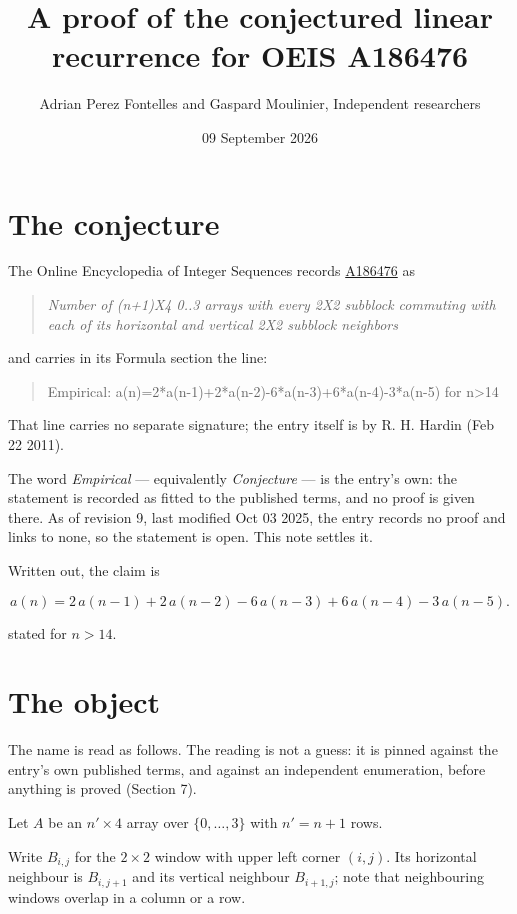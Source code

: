 \documentclass[11pt]{article}
\title{A proof of the conjectured linear recurrence for OEIS A186476}
\author{Adrian Perez Fontelles and Gaspard Moulinier, Independent researchers}
\date{09 September 2026}
\theoremstyle{definition}
\begin{document}
\maketitle
\section{The conjecture}

The Online Encyclopedia of Integer Sequences records \href{https://oeis.org/A186476}{A186476} as

\begin{quote}\itshape Number of (n+1)X4 0..3 arrays with every 2X2 subblock commuting with each of its horizontal and vertical 2X2 subblock neighbors\end{quote}

and carries in its Formula section the line:

\begin{quote}\ttfamily Empirical: a(n)=2*a(n-1)+2*a(n-2)-6*a(n-3)+6*a(n-4)-3*a(n-5) for n>14\end{quote}

That line carries no separate signature; the entry itself is by R. H. Hardin (Feb 22 2011).

The word {\itshape Empirical} --- equivalently {\itshape Conjecture} --- is the entry's own: the statement is recorded as fitted to the published terms, and no proof is given there. As of revision 9, last modified Oct 03 2025, the entry records no proof and links to none, so the statement is open. This note settles it.

Written out, the claim is

\[a(n) = 2\,a(n-1) + 2\,a(n-2) - 6\,a(n-3) + 6\,a(n-4) - 3\,a(n-5).\]

stated for $n > 14$.

\section{The object}

The name is read as follows. The reading is not a guess: it is pinned against the entry's own published terms, and against an independent enumeration, before anything is proved (Section 7).

Let $A$ be an $n' \times 4$ array over $\{0,\dots,3\}$ with $n' = n + 1$ rows.

Write $B_{i,j}$ for the $2\times2$ window with upper left corner $(i,j)$. Its horizontal neighbour is $B_{i,j+1}$ and its vertical neighbour $B_{i+1,j}$; note that neighbouring windows overlap in a column or a row.
\end{document}
